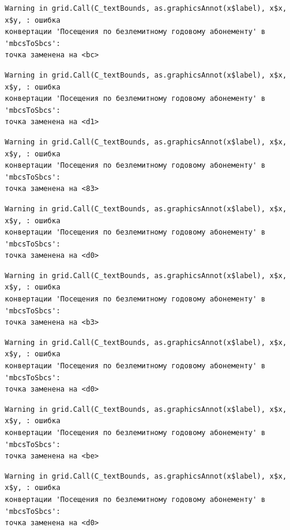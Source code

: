 \documentclass[
  letterpaper,
  DIV=11,
  numbers=noendperiod]{scrreprt}
\begin{document}
\begin{verbatim}
Warning in grid.Call(C_textBounds, as.graphicsAnnot(x$label), x$x, x$y, : ошибка
конвертации 'Посещения по безлемитному годовому абонементу' в 'mbcsToSbcs':
точка заменена на <bc>
\end{verbatim}

\begin{verbatim}
Warning in grid.Call(C_textBounds, as.graphicsAnnot(x$label), x$x, x$y, : ошибка
конвертации 'Посещения по безлемитному годовому абонементу' в 'mbcsToSbcs':
точка заменена на <d1>
\end{verbatim}

\begin{verbatim}
Warning in grid.Call(C_textBounds, as.graphicsAnnot(x$label), x$x, x$y, : ошибка
конвертации 'Посещения по безлемитному годовому абонементу' в 'mbcsToSbcs':
точка заменена на <83>
\end{verbatim}

\begin{verbatim}
Warning in grid.Call(C_textBounds, as.graphicsAnnot(x$label), x$x, x$y, : ошибка
конвертации 'Посещения по безлемитному годовому абонементу' в 'mbcsToSbcs':
точка заменена на <d0>
\end{verbatim}

\begin{verbatim}
Warning in grid.Call(C_textBounds, as.graphicsAnnot(x$label), x$x, x$y, : ошибка
конвертации 'Посещения по безлемитному годовому абонементу' в 'mbcsToSbcs':
точка заменена на <b3>
\end{verbatim}

\begin{verbatim}
Warning in grid.Call(C_textBounds, as.graphicsAnnot(x$label), x$x, x$y, : ошибка
конвертации 'Посещения по безлемитному годовому абонементу' в 'mbcsToSbcs':
точка заменена на <d0>
\end{verbatim}

\begin{verbatim}
Warning in grid.Call(C_textBounds, as.graphicsAnnot(x$label), x$x, x$y, : ошибка
конвертации 'Посещения по безлемитному годовому абонементу' в 'mbcsToSbcs':
точка заменена на <be>
\end{verbatim}

\begin{verbatim}
Warning in grid.Call(C_textBounds, as.graphicsAnnot(x$label), x$x, x$y, : ошибка
конвертации 'Посещения по безлемитному годовому абонементу' в 'mbcsToSbcs':
точка заменена на <d0>
\end{verbatim}
\end{document}
